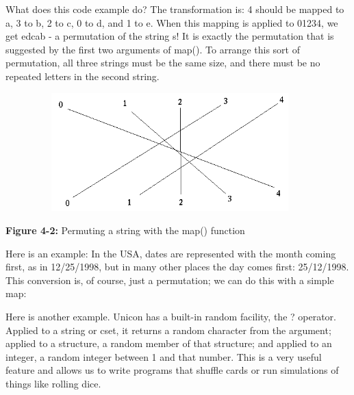 
What does this code example do? The transformation is:
\textsf{{\textquotedbl}4{\textquotedbl}} should be mapped to
\textsf{{\textquotedbl}a{\textquotedbl}},
\textsf{{\textquotedbl}3{\textquotedbl}} to
\textsf{{\textquotedbl}b{\textquotedbl}},
\textsf{{\textquotedbl}2{\textquotedbl}} to
\textsf{{\textquotedbl}c{\textquotedbl}},
\textsf{{\textquotedbl}0{\textquotedbl}} to
\textsf{{\textquotedbl}d{\textquotedbl}}, and
\textsf{{\textquotedbl}1{\textquotedbl}} to
\textsf{{\textquotedbl}e{\textquotedbl}}. When this mapping is applied
to \textsf{{\textquotedbl}01234{\textquotedbl}}, we get
\textsf{{\textquotedbl}edcab{\textquotedbl}} - a permutation of the
string \textsf{s}! It is exactly the permutation that is suggested by
the first two arguments of \textsf{map()}. To arrange this sort of
permutation, all three strings must be the same size, and there must be
no repeated letters in the second string.


\begin{center}
\includegraphics[width=5.0in,height=1.8in]{ub-img/ub-img9.png}
\end{center}
{\sffamily\bfseries Figure 4-2:}
{\sffamily Permuting a string with the map() function}

\bigskip

Here is an example: In the USA, dates are represented with the month
coming first, as in 12/25/1998, but in many other places the day comes
first: 25/12/1998. This conversion is, of course, just a permutation;
we can do this with a simple map:


Here is another example. Unicon has a built-in random facility, the
\textsf{?} operator. Applied to a string or cset, it returns a random
character from the argument; applied to a structure, a random member of
that structure; and applied to an integer, a random integer between 1
and that number. This is a very useful feature and allows us to write
programs that shuffle cards or run simulations of things like rolling
dice.

